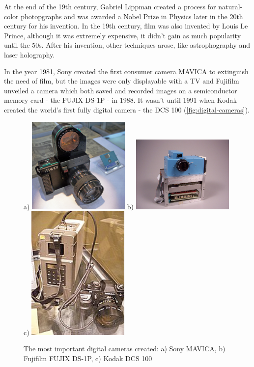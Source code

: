 \documentclass{report}
\begin{document}
At the end of the 19th century, Gabriel Lippman created a process for natural-color photopgraphs and was awarded a Nobel Prize in Physics later in the 20th century for his invention.
In the 19th century, film was also invented by Louis Le Prince, although it was extremely expensive, it didn't gain as much popularity until the 50s.
After his invention, other techniques arose, like astrophography and laser holography.

In the year 1981, Sony created the first consumer camera MAVICA to extinguish the need of film, but the images were only displayable with a TV and Fujifilm unveiled a camera which both saved and recorded images on a semiconductor memory card - the FUJIX DS-1P - in 1988. It wasn't until 1991 when Kodak created the world's first fully digital camera - the DCS 100 (\autoref{fig:digital-cameras}). 

\begin{figure}[h]
\center
a) \includegraphics[width=5cm]{img/mavica}
b) \includegraphics[width=5cm]{img/fujix}
c) \includegraphics[width=5cm]{img/dcs100}
\caption{The most important digital cameras created: a) Sony MAVICA,
b) Fujifilm FUJIX DS-1P, c) Kodak DCS 100}
\label{fig:digital-cameras}
\end{figure}
\end{document}
